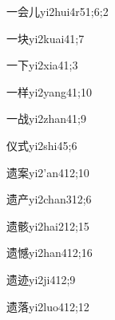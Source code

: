 \begin{verbete}{一会儿}{yi2hui4r5}{1;6;2}
\end{verbete}

\begin{verbete}{一块}{yi2kuai4}{1;7}
\end{verbete}

\begin{verbete}{一下}{yi2xia4}{1;3}
\end{verbete}

\begin{verbete}{一样}{yi2yang4}{1;10}
\end{verbete}

\begin{verbete}{一战}{yi2zhan4}{1;9}
\end{verbete}

\begin{verbete}{仪式}{yi2shi4}{5;6}
\end{verbete}

\begin{verbete}{遗案}{yi2'an4}{12;10}
\end{verbete}

\begin{verbete}{遗产}{yi2chan3}{12;6}
\end{verbete}

\begin{verbete}{遗骸}{yi2hai2}{12;15}
\end{verbete}

\begin{verbete}{遗憾}{yi2han4}{12;16}
\end{verbete}

\begin{verbete}{遗迹}{yi2ji4}{12;9}
\end{verbete}

\begin{verbete}{遗落}{yi2luo4}{12;12}
\end{verbete}


